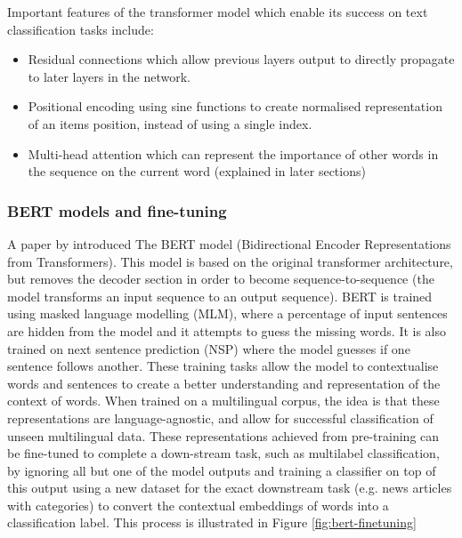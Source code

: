 \documentclass{l4proj}
\begin{document}
Important features of the transformer model which enable its success on text classification tasks include:
\begin{itemize}
    \item Residual connections which allow previous layers output to directly propagate to later layers in the network.
    \item Positional encoding using sine functions to create normalised representation of an items position, instead of using a single index.
    \item Multi-head attention which can represent the importance of other words in the sequence on the current word (explained in later sections)
\end{itemize}

\subsubsection{BERT models and fine-tuning} \hfill \par
A paper by \cite{devlin2018bert} introduced The BERT model (Bidirectional Encoder Representations from Transformers). This model is based on the original transformer architecture, but removes the decoder section in order to become sequence-to-sequence (the model transforms an input sequence to an output sequence). BERT is trained using masked language modelling (MLM), where a percentage of input sentences are hidden from the model and it attempts to guess the missing words. It is also trained on next sentence prediction (NSP) where the model guesses if one sentence follows another. These training tasks allow the model to contextualise words and sentences to create a better understanding and representation of the context of words. When trained on a multilingual corpus, the idea is that these representations are language-agnostic, and allow for successful classification of unseen multilingual data. These representations achieved from pre-training can be fine-tuned to complete a down-stream task, such as multilabel classification, by ignoring all but one of the model outputs and training a classifier on top of this output using a new dataset for the exact downstream task (e.g. news articles with categories) to convert the contextual embeddings of words into a classification label. This process is illustrated in Figure \ref{fig:bert-finetuning}
\end{document}
